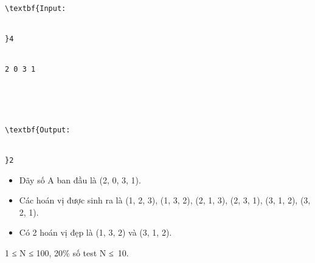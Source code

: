 \begin{verbatim}
\textbf{Input:


}4


2 0 3 1





\textbf{Output:


}2\end{verbatim}
\begin{itemize}
	\item     Dãy số A ban đầu là (2, 0, 3, 1).   
	\item     Các hoán vị được sinh ra là (1, 2, 3), (1, 3, 2), (2, 1, 3), (2, 3, 1), (3, 1, 2), (3, 2, 1).   
	\item     Có 2 hoán vị đẹp là (1, 3, 2) và (3, 1, 2).   
\end{itemize}
1 ≤ N ≤ 100, 20\% số test N ≤ 10.
